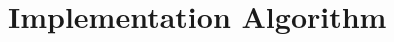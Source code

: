 \documentclass[../report.tex]{subfiles}
\begin{document}
	
	
\chapter{Implementation Algorithm}\label{sec:fab_process}
\end{document}
